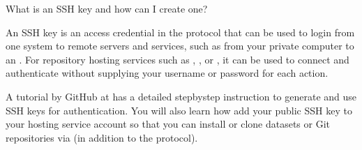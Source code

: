 \ignorespaces {}\label{\detokenize{basics/101-139-hostingservices:sshkey}}\begin{findoutmore}[label={fom-sshkey}, before title={\thetcbcounter\ }, float, floatplacement=tb, check odd page=true]{What is an SSH key and how can I create one?}
\label{\detokenize{basics/101-139-hostingservices:fom-sshkey}}

\sphinxAtStartPar
An SSH key is an access credential in the {\hyperref[\detokenize{glossary:term-SSH}]{}} protocol that can be used
to login from one system to remote servers and services, such as from your private
computer to an {\hyperref[\detokenize{glossary:term-SSH-server}]{}}. For repository hosting services such as {\hyperref[\detokenize{glossary:term-GIN}]{}},
{\hyperref[\detokenize{glossary:term-GitHub}]{}}, or {\hyperref[\detokenize{glossary:term-GitLab}]{}}, it can be used to connect and authenticate
without supplying your username or password for each action.

\sphinxAtStartPar
A tutorial by GitHub at 
has a detailed step\sphinxhyphen{}by\sphinxhyphen{}step instruction to generate and use SSH keys for authentication.
You will also learn how add your public SSH key to your hosting service account
so that you can install or clone datasets or Git repositories via  (in addition
to the  protocol).


\end{findoutmore}
